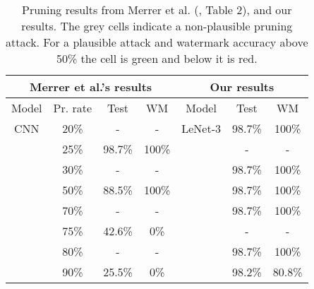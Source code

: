 
\begin{table}
\small
\centering
\caption{Pruning results from Merrer et al. (\cite{merrer_adversarial_2019}, Table 2), and our results. The grey cells indicate a non-plausible pruning attack. For a plausible attack and watermark accuracy above 50\% the cell is green and below it is red.}
\label{fig:compare-results-pruning:frontier}
\begin{tabular}{|c|c|c|c|c|c|c|}
\hline
\multicolumn{4}{|c|}{Merrer et al.'s results}                                                                  & \multicolumn{3}{c|}{Our results}                                          \\ \hline
Model & Pr. rate                     & Test                           & WM                            & Model   & Test                           & WM                             \\ \hline
CNN   & 20\%                         & -                              & -                             & LeNet-3 & 98.7\%                         & \cellcolor[HTML]{BAE5C5}100\%  \\ \hline
      & 25\%                         & 98.7\%                         & \cellcolor[HTML]{BAE5C5}100\% &         & -                              & -                              \\ \hline
      & 30\%                         & -                              & -                             &         & 98.7\%                         & \cellcolor[HTML]{BAE5C5}100\%  \\ \hline
      & 50\%                         & \cellcolor[HTML]{C0C0C0}88.5\% & \cellcolor[HTML]{C0C0C0}100\% &         & 98.7\%                         & \cellcolor[HTML]{BAE5C5}100\%  \\ \hline
      & 70\%                         & -                              & -                             &         & 98.7\%                         & \cellcolor[HTML]{BAE5C5}100\%  \\ \hline
      & 75\%                         & \cellcolor[HTML]{C0C0C0}42.6\% & \cellcolor[HTML]{C0C0C0}0\%   &         & -                              & -                              \\ \hline
      & 80\%                         & -                              & -                             &         & 98.7\%                         & \cellcolor[HTML]{BAE5C5}100\%  \\ \hline
      & 90\%                         & \cellcolor[HTML]{C0C0C0}25.5\% & \cellcolor[HTML]{C0C0C0}0\%   &         & 98.2\%                         & \cellcolor[HTML]{BAE5C5}80.8\% \\ \hline

\end{tabular}
\end{table}
